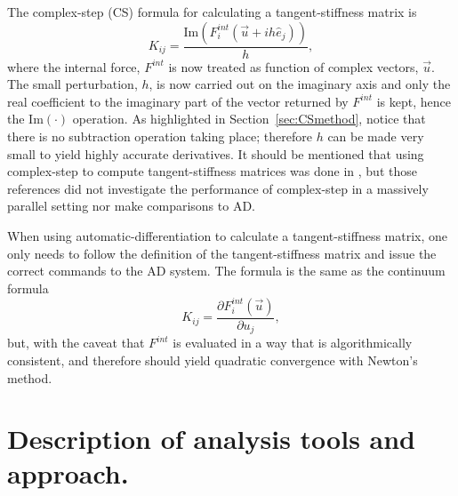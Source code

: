 \documentclass[preprint,12pt]{elsarticle}
\begin{document}
The complex-step (CS) formula for calculating a tangent-stiffness matrix is
%
\begin{equation} 
  K_{ij} = \frac{\mbox{Im}(F_i^{int}(\vec{u} + i h \hat{e}_j))}{h},
\end{equation}
%
where the internal force, $F^{int}$ is now treated as function of complex vectors,  $\vec{u}$. The small perturbation, $h$, is now carried out on the imaginary axis and only the real coefficient to the imaginary part of the vector returned by $F^{int}$ is kept, hence the $\mbox{Im}(\cdot)$ operation. As highlighted in Section~\ref{sec:CSmethod}, notice that there is no subtraction operation taking place; therefore $h$ can be made very small to yield highly accurate derivatives. It should be mentioned that using complex-step to compute tangent-stiffness matrices was done in \cite{perez2000numerical,perez2012numerical}, but those references did not investigate the performance of complex-step in a massively parallel setting nor make comparisons to AD. 

When using automatic-differentiation to calculate a tangent-stiffness matrix, one only needs to follow the definition of the tangent-stiffness matrix and issue the correct commands to the AD system. The formula is the same as the continuum formula
%
\begin{equation} 
  K_{ij} = \frac{\partial F_i^{int}(\vec{u})}{\partial u_j},
\end{equation}
%
but, with the caveat that $F^{int}$ is evaluated in a way that is algorithmically consistent, and therefore should yield quadratic convergence with Newton's method.

\section{Description of analysis tools and approach.} 
%
\end{document}
